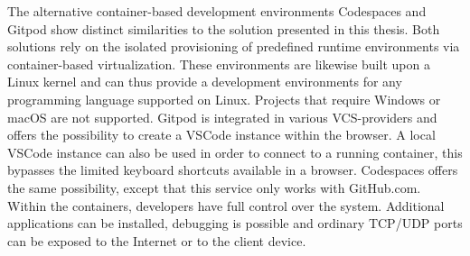 The alternative container-based development environments Codespaces and Gitpod show distinct similarities to the solution presented in this thesis. Both solutions rely on the isolated provisioning of predefined runtime environments via container-based virtualization. These environments are likewise built upon a Linux kernel and can thus provide a development environments for any programming language supported on Linux. Projects that require Windows or macOS are not supported.\newline
Gitpod is integrated in various \ac{VCS}-providers and offers the possibility to create a \ac{VSCode} instance within the browser. A local \ac{VSCode} instance can also be used in order to connect to a running container, this bypasses the limited keyboard shortcuts available in a browser. Codespaces offers the same possibility, except that this service only works with GitHub.com. Within the containers, developers have full control over the system. Additional applications can be installed, debugging is possible and ordinary TCP/UDP ports can be exposed to the Internet or to the client device.\newline
